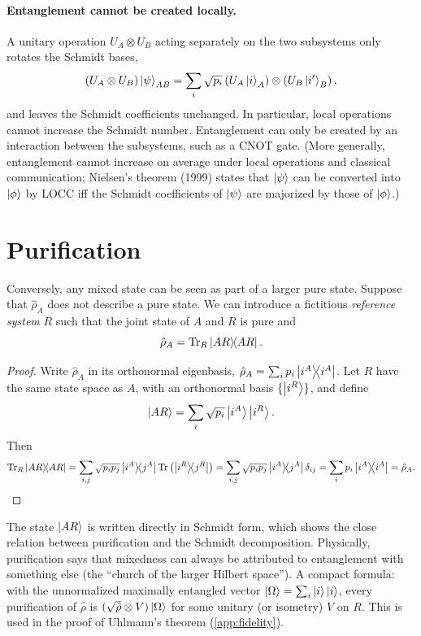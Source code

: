 \paragraph{Entanglement cannot be created locally.} A unitary operation $U_A\otimes U_B$ acting separately on the two subsystems only rotates the Schmidt bases,
\begin{equation}
  (U_A\otimes U_B)\left|\psi\right\rangle_{AB}=\sum_i\sqrt{p_i}\left(U_A\left|i\right\rangle_A\right)\otimes\left(U_B\left|i'\right\rangle_B\right),
\end{equation}
and leaves the Schmidt coefficients unchanged. In particular, local operations cannot increase the Schmidt number. Entanglement can only be created by an interaction between the subsystems, such as a CNOT gate. (More generally, entanglement cannot
increase on average under local operations and classical communication; Nielsen's theorem (1999) states that $\left|\psi\right\rangle$ can be converted into $\left|\phi\right\rangle$ by LOCC iff the Schmidt coefficients of $\left|\psi\right\rangle$ are majorized by those of $\left|\phi\right\rangle$.)

\section{Purification}\label{app:purification}
Conversely, any mixed state can be seen as part of a larger pure state. Suppose that $\hat\rho_A$ does not describe a pure state. We can introduce a fictitious \emph{reference system} $R$ such that the joint state of $A$ and $R$ is pure and
\begin{equation}
  \hat\rho_A=\operatorname{Tr}_R\left|AR\middle\rangle\!\middle\langle AR\right|.
\end{equation}
\begin{proof}
Write $\hat\rho_A$ in its orthonormal eigenbasis, $\hat\rho_A=\sum_ip_i\left|i^A\middle\rangle\!\middle\langle i^A\right|$. Let $R$ have the same state space as $A$, with an orthonormal basis $\{\left|i^R\right\rangle\}$, and define
\begin{equation}
  \left|AR\right\rangle=\sum_i\sqrt{p_i}\left|i^A\right\rangle\left|i^R\right\rangle.
\end{equation}
Then
\begin{equation}
  \operatorname{Tr}_R\left|AR\middle\rangle\!\middle\langle AR\right|=\sum_{i,j}\sqrt{p_ip_j}\left|i^A\middle\rangle\!\middle\langle j^A\right|\operatorname{Tr}\left(\left|i^R\middle\rangle\!\middle\langle j^R\right|\right)=\sum_{i,j}\sqrt{p_ip_j}\left|i^A\middle\rangle\!\middle\langle j^A\right|\delta_{ij}=\sum_ip_i\left|i^A\middle\rangle\!\middle\langle i^A\right|=\hat\rho_A.\qedhere
\end{equation}
\end{proof}
The state $\left|AR\right\rangle$ is written directly in Schmidt form, which shows the close relation between purification and the Schmidt decomposition. Physically, purification says that mixedness can always be attributed to entanglement with
something else (the ``church of the larger Hilbert space''). A compact formula: with the unnormalized maximally entangled vector $\left|\Omega\right\rangle=\sum_i\left|i\right\rangle\left|i\right\rangle$, every purification of $\hat\rho$ is $(\sqrt{\hat\rho}\otimes V)\left|\Omega\right\rangle$
for some unitary (or isometry) $V$ on $R$. This is used in the proof of Uhlmann's theorem (\cref{app:fidelity}).

